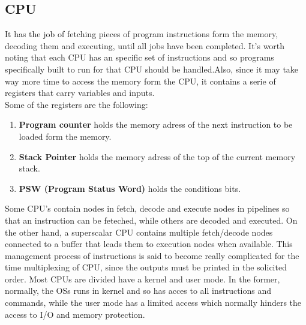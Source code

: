 \documentclass[12pt]{article}
\begin{document}
       \subsection{CPU}
       It has the job of fetching pieces of program instructions form the memory, decoding them and executing, until all jobs have been completed. It's worth noting that each CPU has an specific set of instructions and so programs specifically built to run for that CPU should be handled.Also, since it may take way more time to access the memory form the CPU, it contains a serie of registers that carry variables and inputs.\\
       Some of the registers are the following:
    \begin{enumerate}
      \item \textbf{Program counter} holds the memory adress of the next instruction to be loaded form the memory.
      \item \textbf{Stack Pointer} holds the memory adress of the top of the current memory stack.
       \item \textbf{PSW (Program Status Word)} holds the conditions bits.
    \end{enumerate}
    Some CPU's contain nodes in fetch, decode and execute nodes in pipelines so that an instruction can be feteched, while others are decoded and executed. On the other hand, a superscalar CPU contains multiple fetch/decode nodes connected to a buffer that leads them to execution nodes when available. This management process of instructions is said to become really complicated for the time multiplexing of CPU, since the outputs must be printed in the solicited order. 
    Most CPUs are divided have a kernel and user mode. In the former, normally, the OSs runs in kernel and so has acces to all instructions and commands, while the user mode has a limited access which normally hinders the access to I/O and memory protection. 
 
\end{document}
